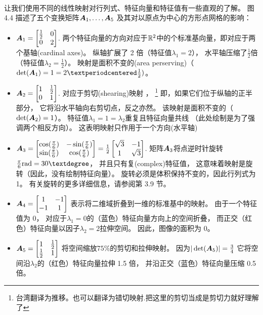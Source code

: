{\\}
让我们使用不同的线性映射对行列式、特征向量和特征值有一些直观的了解。
图 4.4 描述了五个变换矩阵$\boldsymbol{A}_1,\dots,\boldsymbol{A}_5$
及其对以原点为中心的方形点网格的影响：
\begin{itemize}
    \item
    $\boldsymbol{A}_1 = \begin{bmatrix} \frac{1}{2} & 0 \\ 0 & 2 \end{bmatrix}$.
    两个特征向量的方向对应于$\mathbb{R}^2$中的个标准基向量，即对应于两个基轴(cardinal axes)。
    纵轴扩展了 2 倍（特征值$\lambda_1 = 2$），
    水平轴压缩了$\frac{1}{2}$倍（特征值$\lambda_2 = \frac{1}{2}$）。
    映射是面积不变的(area perserving)（$\det(\A_1) = 1 = 2 · \frac{1}{2})$。
    \item
    $\boldsymbol{A}_2 = \begin{bmatrix} 1 & \frac{1}{2} \\ 0 & 1 \end{bmatrix}$.
    对应于剪切(shearing)映射 ，
    \footnote{台湾翻译为推移。也可以翻译为错切映射.把这里的剪切当成是剪切力就好理解了}
    即，如果它们位于纵轴的正半部分，
    它将沿水平轴向右剪切点，反之亦然。
    该映射是面积不变的（$\det(\boldsymbol{A}_2) = 1$）。
    特征值$\lambda_1 = 1 = \lambda_2$重复且特征向量共线
    （此处绘制是为了强调两个相反方向）。
    这表明映射只作用于一个方向(水平轴)
    \item
    $ \boldsymbol{A}_3 =
    \begin{bmatrix}
        \cos(\frac{\pi}{6}) & -\sin(\frac{\pi}{6}) \\
        \sin(\frac{\pi}{6}) & \cos(\frac{\pi}{6})
    \end{bmatrix}
    = \frac{1}{2}
    \begin{bmatrix}
        \sqrt{3} & -1 \\
        1 & \sqrt{3}
    \end{bmatrix}
    $.
    矩阵$\boldsymbol{A}_3$将点逆时针旋转$\frac{\pi}{6} \rad = 30°$，
    并且只有复(complex)特征值，
    这意味着映射是旋转（因此，没有绘制特征向量）。
    旋转必须是体积保持不变的，因此行列式为 1。
    有关旋转的更多详细信息，请参阅第 3.9 节。
    \item
    $\boldsymbol{A}_4 =
    \begin{bmatrix}
        1 & -1 \\
        -1 & 1
    \end{bmatrix}$
    表示将二维域折叠到一维的标准基中的映射。
    由于一个特征值为 0，
    对应于$\lambda_1 = 0$的（蓝色）特征向量方向上的空间折叠，
    而正交（红色）特征向量以因子$\lambda_2 = 2$拉伸空间。
    因此，图像的面积为 0。
    \item
    $\boldsymbol{A}_5 =
    \begin{bmatrix}
        1 & \frac{1}{2} \\
        \frac{1}{2} & 1
    \end{bmatrix}$
    将空间缩放$75\%$的剪切和拉伸映射。
    因为$|\det(\boldsymbol{A}_5)| = \frac{3}{4}$
    它将空间沿$\lambda_2$的（红色）特征向量拉伸 1.5 倍，
    并沿正交（蓝色）特征向量压缩 0.5 倍。
\end{itemize}

